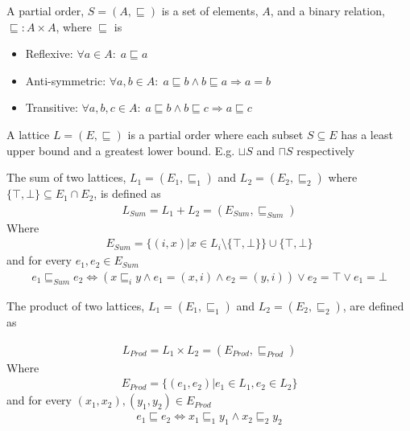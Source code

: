 \begin{definition}
A partial order, $S = (A, \sqsubseteq)$ is a set of elements, $A$, and a binary relation, $\sqsubseteq : A \times A$, where $\sqsubseteq$ is 

\begin{itemize}
\item Reflexive: $\forall a \in A:\; a \sqsubseteq a$
\item Anti-symmetric: $\forall a,b \in A:\; a \sqsubseteq b \wedge b \sqsubseteq a \Rightarrow a = b$
\item Transitive: $\forall a,b,c \in A:\; a \sqsubseteq b \wedge b \sqsubseteq c \Rightarrow a \sqsubseteq c$
\end{itemize}


\end{definition}

\begin{definition}
A lattice $L = (E, \sqsubseteq)$ is a partial order where each subset $S \subseteq E$ has a least upper bound and a greatest lower bound. E.g. $\sqcup S$ and $\sqcap S$ respectively
\end{definition}


\begin{definition}
The sum of two lattices, $L_1 = (E_1, \sqsubseteq_1)$ and $L_2 = (E_2, \sqsubseteq_2)$ where $\{\top, \bot\}\subseteq E_1 \cap E_2$, is defined as
\begin{align}
L_{Sum} = L_1 + L_2 = (E_{Sum}, \sqsubseteq_{Sum})
\end{align}
Where 
\begin{align}
E_{Sum} = \{(i,x) | x \in L_i\setminus\{\top, \bot\}\} \cup \{\top, \bot\}
\end{align}
and for every $e_1, e_2\in E_{Sum}$  
\begin{align}
e_1 \sqsubseteq_{Sum} e_2 \Leftrightarrow (x \sqsubseteq_i y \wedge e_1 = (x,i) \wedge e_2 = (y,i)) \vee e_2 = \top \vee e_1 = \bot
\end{align}
\end{definition}

\begin{definition}
The product of two lattices,  $L_1 = (E_1, \sqsubseteq_1)$ and $L_2 = (E_2, \sqsubseteq_2)$, are defined as 

\begin{align}
L_{Prod} = L_1 \times L_2 = (E_{Prod}, \sqsubseteq_{Prod})
\end{align}
Where 
\begin{align}
E_{Prod} = \{(e_1, e_2) |  e_1 \in L_1, e_2 \in L_2\}
\end{align}
and for every $(x_1, x_2), (y_1, y_2)\in E_{Prod}$ 
\begin{align}
e_1 \sqsubseteq e_2 \Leftrightarrow x_1 \sqsubseteq_1 y_1 \wedge x_2 \sqsubseteq_2 y_2
\end{align}
\end{definition}


